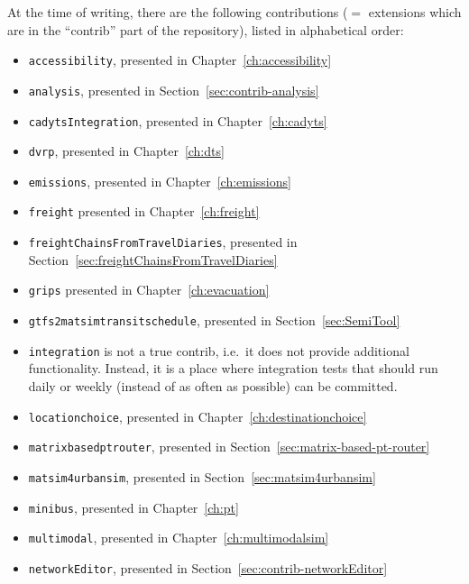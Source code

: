 At the time of writing, there are the following \glspl{contribution} ($=$ extensions which are in the ``contrib'' part of the repository), listed in alphabetical order:
\begin{itemize}\styleItemize
\item \lstinline{accessibility},  
presented in Chapter~\ref{ch:accessibility}
\item \lstinline{analysis}, presented in Section~\ref{sec:contrib-analysis}
\item \lstinline{cadytsIntegration}, 
presented in Chapter~\ref{ch:cadyts}
\item \lstinline{dvrp}, presented in Chapter~\ref{ch:dts}
\item \lstinline{emissions}, presented in Chapter~\ref{ch:emissions}
\item \lstinline{freight} presented in Chapter~\ref{ch:freight}
\item \lstinline{freightChainsFromTravelDiaries}, presented in Section~\ref{sec:freightChainsFromTravelDiaries}
\item \lstinline{grips} presented in Chapter~\ref{ch:evacuation}
\item \lstinline{gtfs2matsimtransitschedule}, presented in Section~\ref{sec:SemiTool}
\item \lstinline{integration} is not a true contrib, i.e.\ it does not provide additional functionality.  Instead, it is a place where integration tests that should run daily or weekly (instead of as often as possible) can be committed.
\item \lstinline{locationchoice}, presented in Chapter~\ref{ch:destinationchoice}
\item \lstinline{matrixbasedptrouter}, presented in Section~\ref{sec:matrix-based-pt-router}
\item \lstinline{matsim4urbansim}, presented in Section~\ref{sec:matsim4urbansim}
\item \lstinline{minibus}, presented in Chapter~\ref{ch:pt}
\item \lstinline{multimodal}, presented in Chapter~\ref{ch:multimodalsim}
\item \lstinline{networkEditor}, presented in Section~\ref{sec:contrib-networkEditor}

\end{itemize}
